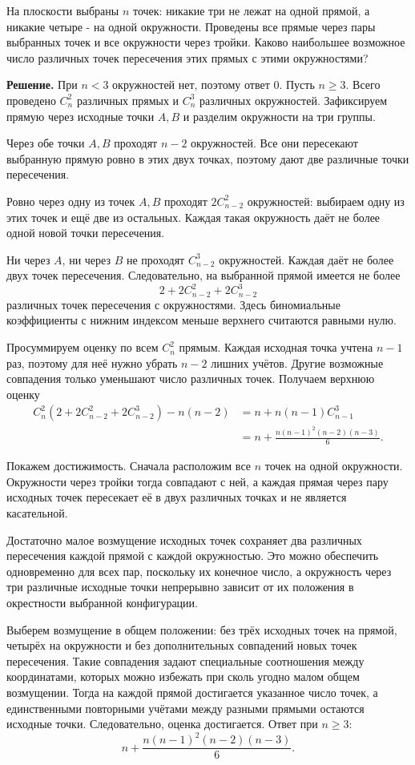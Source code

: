 \begin{problems}
\item На плоскости выбраны $n$ точек: никакие три не лежат на одной прямой, а никакие четыре - на одной окружности. Проведены все прямые через пары выбранных точек и все окружности через тройки. Каково наибольшее возможное число различных точек пересечения этих прямых с этими окружностями?
\par\smallskip\noindent\textbf{Решение.} При $n<3$ окружностей нет, поэтому ответ $0$. Пусть $n\ge3$. Всего проведено $C_n^2$ различных прямых и $C_n^3$ различных окружностей. Зафиксируем прямую через исходные точки $A,B$ и разделим окружности на три группы.
\par Через обе точки $A,B$ проходят $n-2$ окружностей. Все они пересекают выбранную прямую ровно в этих двух точках, поэтому дают две различные точки пересечения.
\par Ровно через одну из точек $A,B$ проходят $2C_{n-2}^2$ окружностей: выбираем одну из этих точек и ещё две из остальных. Каждая такая окружность даёт не более одной новой точки пересечения.
\par Ни через $A$, ни через $B$ не проходят $C_{n-2}^3$ окружностей. Каждая даёт не более двух точек пересечения. Следовательно, на выбранной прямой имеется не более
\[
2+2C_{n-2}^2+2C_{n-2}^3
\]
различных точек пересечения с окружностями. Здесь биномиальные коэффициенты с нижним индексом меньше верхнего считаются равными нулю.
\par Просуммируем оценку по всем $C_n^2$ прямым. Каждая исходная точка учтена $n-1$ раз, поэтому для неё нужно убрать $n-2$ лишних учётов. Другие возможные совпадения только уменьшают число различных точек. Получаем верхнюю оценку
\[
\begin{aligned}
C_n^2\left(2+2C_{n-2}^2+2C_{n-2}^3\right)-n(n-2)
&=n+n(n-1)C_{n-1}^3\\
&=n+\frac{n(n-1)^2(n-2)(n-3)}{6}.
\end{aligned}
\]
\par Покажем достижимость. Сначала расположим все $n$ точек на одной окружности. Окружности через тройки тогда совпадают с ней, а каждая прямая через пару исходных точек пересекает её в двух различных точках и не является касательной.
\par Достаточно малое возмущение исходных точек сохраняет два различных пересечения каждой прямой с каждой окружностью. Это можно обеспечить одновременно для всех пар, поскольку их конечное число, а окружность через три различные исходные точки непрерывно зависит от их положения в окрестности выбранной конфигурации.
\par Выберем возмущение в общем положении: без трёх исходных точек на прямой, четырёх на окружности и без дополнительных совпадений новых точек пересечения. Такие совпадения задают специальные соотношения между координатами, которых можно избежать при сколь угодно малом общем возмущении. Тогда на каждой прямой достигается указанное число точек, а единственными повторными учётами между разными прямыми остаются исходные точки. Следовательно, оценка достигается. Ответ при $n\ge3$:
\[
\boxed{n+\frac{n(n-1)^2(n-2)(n-3)}{6}}.
\]\par


\end{problems}
